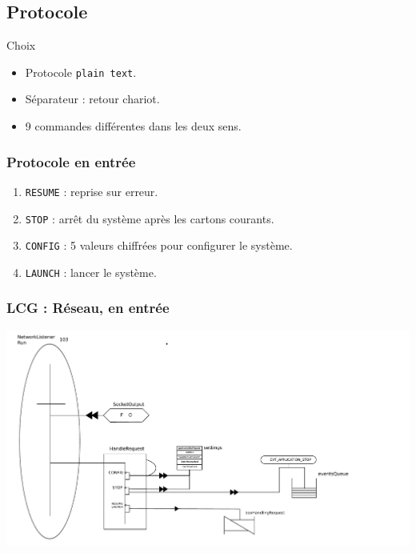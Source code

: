 \documentclass{beamer}
\begin{document}
	\subsection{Protocole}
	\begin{frame}
	    \begin{block}{Choix}
		  \begin{itemize}
		      \item Protocole \texttt{plain text}.
		      \item Séparateur : retour chariot.
		      \item 9 commandes différentes dans les deux sens.
		  \end{itemize}
	    \end{block}
	\end{frame}

	\begin{frame}
		\frametitle{Protocole en entrée}
		\begin{enumerate}
		    \item \texttt{RESUME} : reprise sur erreur.
		    \item \texttt{STOP} : arrêt du système après les cartons courants.
		    \item \texttt{CONFIG} : 5 valeurs chiffrées pour configurer le système.
		    \item \texttt{LAUNCH} : lancer le système.
		\end{enumerate}
	\end{frame}

	\begin{frame}
	    \frametitle{LCG : Réseau, en entrée}
	    \includegraphics[width=\textwidth]{../../SchemasLCG/NetworkListener-run.pdf}
	\end{frame}
\end{document}
